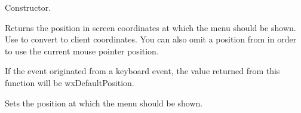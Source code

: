 Constructor.

\label{wxcontextmenueventgetposition}


Returns the position in screen coordinates at which the menu should be shown. Use  to
convert to client coordinates. You can also omit a position from  in order to use
the current mouse pointer position.

If the event originated from a keyboard event, the value returned from this function will be wxDefaultPosition.

\label{wxcontextmenueventsetposition}


Sets the position at which the menu should be shown.

